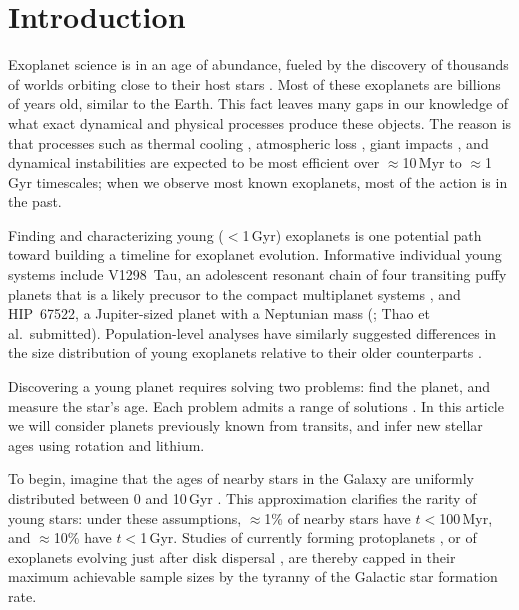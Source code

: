 \documentclass[11pt,twocolumn,tighten]{aastex63}
\begin{document}
\section{Introduction}
\label{sec:intro}

Exoplanet science is in an age of abundance, fueled by the discovery
of thousands of worlds orbiting close to their host stars
\citep{Borucki10,2015JATIS...1a4003R}.  Most of these exoplanets are
billions of years old, similar to the Earth.  This fact leaves many
gaps in our knowledge of what exact dynamical and physical processes
produce these objects.    The reason is that processes such as thermal
cooling \citep{2007ApJ...659.1661F}, atmospheric loss
\citep{2019AREPS..47...67O}, giant impacts
\citep{2014prpl.conf..595R}, and dynamical instabilities
\citep{2017MNRAS.470.1750I} are expected to be most efficient over
$\approx$10\,Myr to $\approx$1\,Gyr timescales; when we observe most
known exoplanets, most of the action is in the past.

Finding and characterizing young ($<$1\,Gyr) exoplanets is one
potential path toward building a timeline for exoplanet evolution.
Informative individual young systems include V1298~Tau, an adolescent
resonant chain of four transiting puffy planets that is a likely
precusor to the compact multiplanet systems \citep{David_2019}, and
HIP~67522, a Jupiter-sized planet with a Neptunian mass
(\citealt{Rizzuto_2020}; Thao et al.~submitted).  Population-level
analyses have similarly suggested differences in the size distribution
of young exoplanets relative to their older counterparts
\citep{Berger_2020b_rpage,David_2021,Sandoval_2021,2023AJ....166..248C,2024arXiv240303261V}.

Discovering a young planet requires solving two problems: find the
planet, and measure the star's age.  Each problem admits a range of
solutions \citep[e.g.][]{2008Sci...322.1348M,2012ApJ...756L..33Q}.  In
this article we will consider planets previously known from transits,
and infer new stellar ages using rotation and lithium.

To begin, imagine that the ages of nearby stars in the Galaxy are
uniformly distributed between 0 and 10\,Gyr
\citep[e.g.][]{Nordstrom_2004}.  This approximation clarifies the
rarity of young stars: under these assumptions, $\approx$1\% of nearby
stars have $t$$<$100\,Myr, and $\approx$10\% have $t$$<$1\,Gyr.
Studies of currently forming protoplanets \citep{2018A&A...617A..44K},
or of exoplanets evolving just after disk dispersal
\citep[e.g.][]{2022MNRAS.512.5067K}, are thereby capped in their
maximum achievable sample sizes by the tyranny of the Galactic star
formation rate.
\end{document}
